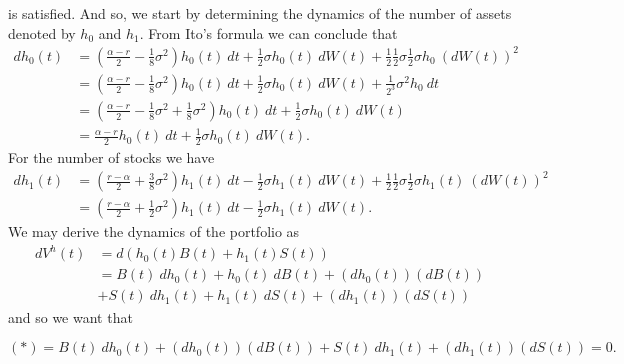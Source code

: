 \documentclass[a4paper,12pt,openany]{book}
\begin{document}
is satisfied. And so, we start by determining the dynamics of the number of assets denoted by \(h_0\) and \(h_1\). From Ito's formula we can conclude that
\begin{align*}
dh_0(t)&=\left(\frac{\alpha - r}{2}-\frac{1}{8}\sigma^2\right)h_0(t)\ dt+\frac{1}{2}\sigma h_0(t)\ dW(t)+\frac{1}{2} \frac{1}{2}\sigma \frac{1}{2}\sigma h_0 \ (d W(t))^2\\
&=\left(\frac{\alpha - r}{2}-\frac{1}{8}\sigma^2\right)h_0(t)\ dt+\frac{1}{2}\sigma h_0(t)\ dW(t)+ \frac{1}{2^3}\sigma^2 h_0 \ dt\\
&=\left(\frac{\alpha - r}{2}-\frac{1}{8}\sigma^2+ \frac{1}{8}\sigma^2 \right)h_0(t)\ dt+\frac{1}{2}\sigma h_0(t)\ dW(t)\\
&=\frac{\alpha - r}{2}h_0(t)\ dt+\frac{1}{2}\sigma h_0(t)\ dW(t).
\end{align*}
For the number of stocks we have
\begin{align*}
dh_1(t)&=\left(\frac{r-\alpha}{2}+\frac{3}{8}\sigma^2\right)h_1(t)\ dt-\frac{1}{2}\sigma h_1(t)\ dW(t)+ \frac{1}{2}\frac{1}{2}\sigma\frac{1}{2}\sigma h_1(t)\ (dW(t))^2\\
&=\left(\frac{r-\alpha}{2}+\frac{1}{2}\sigma^2\right)h_1(t)\ dt-\frac{1}{2}\sigma h_1(t)\ dW(t).
\end{align*}
We may derive the dynamics of the portfolio as
\begin{align*}
dV^h(t)&=d(h_0(t)B(t)+h_1(t)S(t))\\
&=B(t)\ dh_0(t)+h_0(t)\ dB(t)+(dh_0(t))(dB(t))\\
&+S(t)\ dh_1(t)+h_1(t)\ dS(t)+(dh_1(t))(dS(t))
\end{align*}
and so we want that

\[
(*)=B(t)\ dh_0(t)+(dh_0(t))(dB(t))+S(t)\ dh_1(t)+(dh_1(t))(dS(t))=0.
\]
\end{document}
